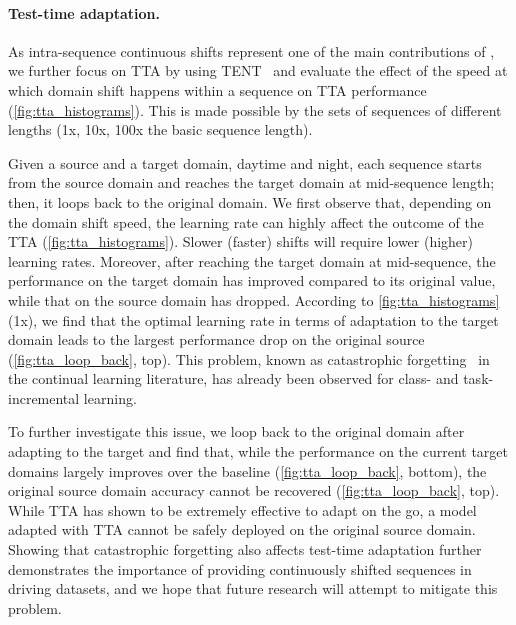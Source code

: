 \paragraph{Test-time adaptation.} As intra-sequence continuous shifts 
represent one of the main contributions of \thedataset, we further focus on TTA by using TENT~\cite{wang2020tent} and evaluate the effect of the speed at which domain shift happens within a sequence on TTA performance (\autoref{fig:tta_histograms}). This is made possible by the sets of sequences of different lengths (1x, 10x, 100x the basic sequence length). 

Given a source and a target domain, \eg{} daytime and night, each sequence starts from the source domain and reaches the target domain at mid-sequence length; then, it loops back to the original domain. 
We first observe that, depending on the domain shift speed, the learning rate can highly affect the outcome of the TTA (\autoref{fig:tta_histograms}). Slower (faster) shifts will require lower (higher) learning rates. 
Moreover, after reaching the target domain at mid-sequence, the performance on the target domain has improved compared to its original value, while that on the source domain has dropped.  
According to \autoref{fig:tta_histograms} (1x), we find that the optimal learning rate in terms of adaptation to the target domain leads to the largest performance drop on the original source (\autoref{fig:tta_loop_back}, top). This problem, known as catastrophic forgetting~\cite{kirkpatrick2017overcoming} in the continual learning literature, has already been observed for class- and task-incremental learning.

To further investigate this issue, we loop back to the original domain after adapting to the target and find that, while the performance on the current target domains largely improves over the baseline (\autoref{fig:tta_loop_back}, bottom), the original source domain accuracy cannot be recovered (\autoref{fig:tta_loop_back}, top).
While TTA has shown to be extremely effective to adapt on the go, a model adapted with TTA cannot be safely deployed on the original source domain.
Showing that catastrophic forgetting also affects test-time adaptation further demonstrates the importance of providing continuously shifted sequences in driving datasets, and we hope that future research will attempt to mitigate this problem. 

